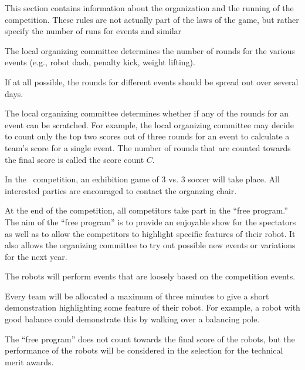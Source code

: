 \documentclass[12pt]{hurocup}
\begin{document}
This section contains information about the organization and the
running of the competition. These rules are not actually part of the
laws of the game, but rather specify the number of runs for events and
similar 

\label{law:number-of-events}

\begin{lawlist}[ORG]
  
\item The local organizing committee determines the number of rounds
 for the various events (e.g., robot dash, penalty kick, weight lifting).
  
\item If at all possible, the rounds for different events should be spread out  over several days.
 
\item The local organizing committee determines whether if any of the rounds 
 for an event can be scratched. For example, the local organizing
 committee may decide to count only the top two scores out of three
 rounds for an event to calculate a team's score for a single
 event. The number of rounds that are counted towards the final score
 is called the score count $C$.

\end{lawlist}

\begin{decisions}

\item In the \thisyear\ competition, an exhibition game of 3 vs. 3
  soccer will take place. All interested parties are encouraged to
  contact the organzing chair.
\end{decisions}


\begin{lawlist}[ORG]
  
\item At the end of the competition, all competitors take part in the
 ``free program.'' The aim of the ``free program'' is to provide an
 enjoyable show for the spectators as well as to allow the competitors
 to highlight specific features of their robot. It also allows the
 organizing committee to try out possible new events or variations for
 the next year.
  
\item The robots will perform events that are loosely based on the
 competition events. 
  
\item Every team will be allocated a maximum of three minutes to give
 a short demonstration highlighting some feature of their robot. For
 example, a robot with good balance could demonstrate this by walking
 over a balancing pole.
  
\item The ``free program'' does not count towards the final score of
 the robots, but the performance of the robots will be considered in
 the selection for the technical merit awards.

\end{lawlist}
\end{document}
